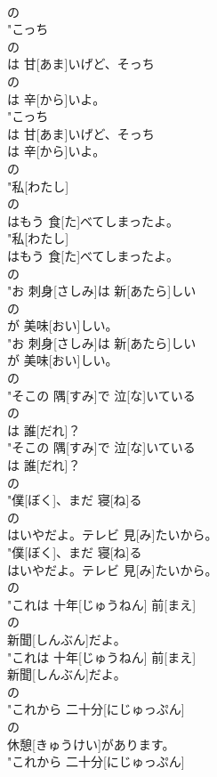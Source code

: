 \documentclass[8pt]{extreport}
\begin{document}
\begin{CJK}{UTF8}{min}
\\	の
\\	"こっち
\\	の
\\	は 甘[あま]いげど、そっち
\\	の
\\	は 辛[から]いよ。
\\	"こっち
\\	は 甘[あま]いげど、そっち
\\	は 辛[から]いよ。
\\	の
\\	"私[わたし]
\\	の
\\	はもう 食[た]べてしまったよ。
\\	"私[わたし]
\\	はもう 食[た]べてしまったよ。
\\	の
\\	"お 刺身[さしみ]は 新[あたら]しい
\\	の
\\	が 美味[おい]しい。
\\	"お 刺身[さしみ]は 新[あたら]しい
\\	が 美味[おい]しい。
\\	の
\\	"そこの 隅[すみ]で 泣[な]いている
\\	の
\\	は 誰[だれ]？
\\	"そこの 隅[すみ]で 泣[な]いている
\\	は 誰[だれ]？
\\	の
\\	"僕[ぼく]、まだ 寝[ね]る
\\	の
\\	はいやだよ。テレビ 見[み]たいから。
\\	"僕[ぼく]、まだ 寝[ね]る
\\	はいやだよ。テレビ 見[み]たいから。
\\	の
\\	"これは 十年[じゅうねん] 前[まえ]
\\	の
\\	新聞[しんぶん]だよ。
\\	"これは 十年[じゅうねん] 前[まえ]
\\	新聞[しんぶん]だよ。
\\	の
\\	"これから 二十分[にじゅっぷん]
\\	の
\\	休憩[きゅうけい]があります。
\\	"これから 二十分[にじゅっぷん]

\end{CJK}
\end{document}
